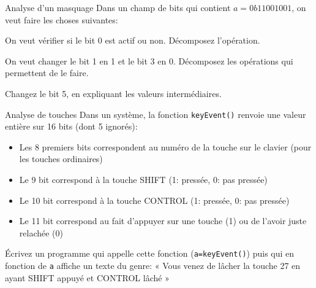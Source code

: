 \begin{exercice}
  \begin{exercicelet}{Analyse d'un masquage}
    Dans un champ de bits qui contient $a=0b11001001$, on veut faire les
    choses suivantes:
    \begin{questions}
    \item On veut vérifier si le bit 0 est actif ou non. Décomposez
      l'opération.
    \item On veut changer le bit 1 en 1 et le bit 3 en 0. Décomposez les
      opérations qui permettent de le faire.
    \item Changez le bit 5, en expliquant les valeurs intermédiaires.
    \end{questions}
  \end{exercicelet}
  \begin{exercicelet}{Analyse de touches}
    Dans un système, la fonction \texttt{keyEvent()} renvoie une valeur
    entière sur 16 bits (dont 5 ignorés):
    \begin{itemize}
    \item Les 8 premiers bits correspondent au numéro de la touche sur le
      clavier (pour les touches ordinaires)
    \item Le 9\ieme{} bit correspond à la touche SHIFT (1: pressée, 0: pas
      pressée)
    \item Le 10\ieme{} bit correspond à la touche CONTROL (1: pressée, 0: pas
      pressée)
    \item Le 11\ieme{} bit correspond au fait d'appuyer sur une touche (1) ou
      de l'avoir juste relachée (0)
    \end{itemize}
    \begin{questionshome}
    \item Écrivez un programme qui appelle cette fonction
      (\texttt{a=keyEvent()}) puis qui en fonction de \texttt{a} affiche un
      texte du genre: « Vous venez de lâcher la touche 27 en ayant SHIFT
      appuyé et CONTROL lâché »
    \end{questionshome}
  \end{exercicelet}
\end{exercice}
